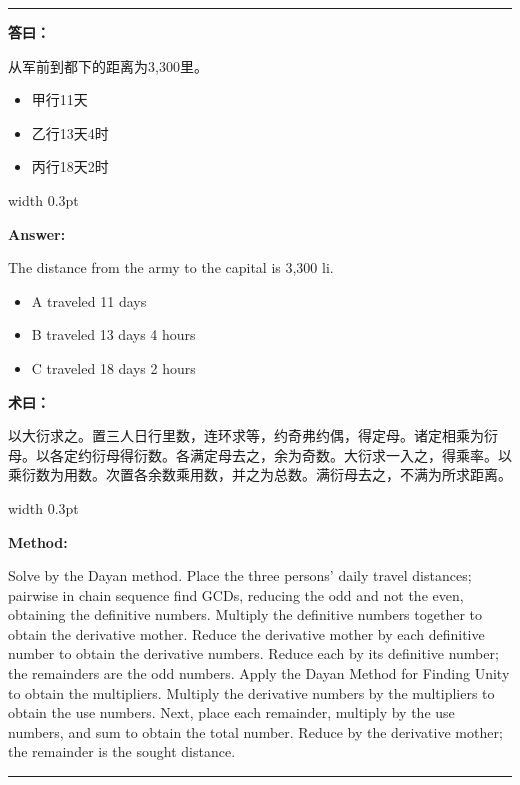 \documentclass[10pt,a4paper]{article}
\newcommand{\cnlabel}[1]{\textcolor{labelcolor}{\textbf{#1}}}
\newcommand{\enlabel}[1]{\textcolor{labelcolor}{\textbf{#1}}}
\newenvironment{problemsection}{%
  \medskip\par\noindent\textcolor{rulecolor}{\rule{\textwidth}{0.4pt}}\par\smallskip%
}{\par\smallskip\noindent\textcolor{rulecolor}{\rule{\textwidth}{0.4pt}}\par\medskip}
\begin{document}
\begin{problemsection}
\vspace{0.3em}

\noindent\begin{minipage}[t]{0.47\textwidth}
\begin{flushleft}
\small
\cnlabel{答曰：}

从军前到都下的距离为3,300里。
\begin{itemize}[leftmargin=*,nosep,topsep=2pt]
  \item 甲行11天
  \item 乙行13天4时
  \item 丙行18天2时
\end{itemize}
\end{flushleft}
\end{minipage}%
\hfill\vrule width 0.3pt\hfill%
\begin{minipage}[t]{0.47\textwidth}
\begin{flushleft}
\small
\enlabel{Answer:}

The distance from the army to the capital is 3,300 li.
\begin{itemize}[leftmargin=*,nosep,topsep=2pt]
  \item A traveled 11 days
  \item B traveled 13 days 4 hours
  \item C traveled 18 days 2 hours
\end{itemize}
\end{flushleft}
\end{minipage}

\vspace{0.3em}

\noindent\begin{minipage}[t]{0.47\textwidth}
\begin{flushleft}
\small
\cnlabel{术曰：}

以大衍求之。置三人日行里数，连环求等，约奇弗约偶，得定母。诸定相乘为衍母。以各定约衍母得衍数。各满定母去之，余为奇数。大衍求一入之，得乘率。以乘衍数为用数。次置各余数乘用数，并之为总数。满衍母去之，不满为所求距离。
\end{flushleft}
\end{minipage}%
\hfill\vrule width 0.3pt\hfill%
\begin{minipage}[t]{0.47\textwidth}
\begin{flushleft}
\small
\enlabel{Method:}

Solve by the Dayan method. Place the three persons' daily travel distances; pairwise in chain sequence find GCDs, reducing the odd and not the even, obtaining the definitive numbers. Multiply the definitive numbers together to obtain the derivative mother. Reduce the derivative mother by each definitive number to obtain the derivative numbers. Reduce each by its definitive number; the remainders are the odd numbers. Apply the Dayan Method for Finding Unity to obtain the multipliers. Multiply the derivative numbers by the multipliers to obtain the use numbers. Next, place each remainder, multiply by the use numbers, and sum to obtain the total number. Reduce by the derivative mother; the remainder is the sought distance.
\end{flushleft}
\end{minipage}


\end{problemsection}
\end{document}
